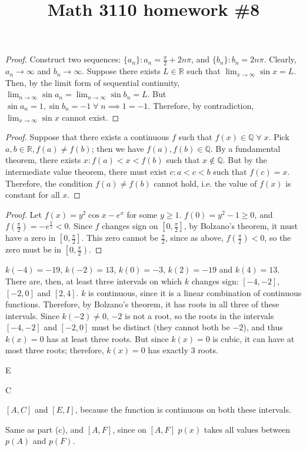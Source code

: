 

\title{Math 3110 homework \#8}
\author{\name}
\maketitle

\begin{proof}
  Construct two sequences: $\{a_n\}: a_n = \frac{\pi}{2} + 2n\pi$, and $\{b_n\}: b_n = 2n\pi$. Clearly, $a_n \rightarrow \infty$ and $b_n \rightarrow \infty$. Suppose there exists $L \in \mathbb{R}$ such that $\lim_{x \rightarrow \infty} \sin x = L$. Then, by the limit form of sequential continuity, $\lim_{n \rightarrow \infty} \sin a_n = \lim_{n \rightarrow \infty} \sin b_n = L$. But $\sin a_n = 1, \sin b_n = -1 \;\forall\; n \implies 1 = -1$. Therefore, by contradiction, $\lim_{x \rightarrow \infty} \sin x$ cannot exist.
\end{proof}

\begin{proof}
  Suppose that there exists a continuous $f$ such that $f(x) \in \mathbb{Q} \;\forall\; x$. Pick $a, b \in \mathbb{R}, f(a) \neq f(b)$; then we have $f(a), f(b) \in \mathbb{Q}$. By a fundamental theorem, there exists $x: f(a) < x < f(b)$ such that $x \notin \mathbb{Q}$. But by the intermediate value theorem, there must exist $c: a < c < b$ such that $f(c) = x$. Therefore, the condition $f(a) \neq f(b)$ cannot hold, i.e. the value of $f(x)$ is constant for all $x$.
\end{proof}

\begin{proof}
  Let $f(x) = y^2 \cos x - e^x$ for some $y \geq 1$. $f(0) = y^2 - 1 \geq 0$, and $f\left(\frac{\pi}{2}\right) = -e^{\frac{\pi}{2}} < 0$. Since $f$ changes sign on $\left[0, \frac{\pi}{2}\right]$, by Bolzano's theorem, it must have a zero in $\left[0, \frac{\pi}{2}\right]$. This zero cannot be $\frac{\pi}{2}$, since as above, $f\left(\frac{\pi}{2}\right) < 0$, so the zero must be in $\left[0, \frac{\pi}{2}\right)$.
\end{proof}


$k(-4) = -19$, $k(-2) = 13$, $k(0) = -3$, $k(2) = -19$ and $k(4) = 13$. There are, then, at least three intervals on which $k$ changes sign: $[-4, -2]$, $[-2, 0]$ and $[2, 4]$. $k$ is continuous, since it is a linear combination of continuous functions. Therefore, by Bolzano's theorem, it has roots in all three of these intervals. Since $k(-2) \neq 0$, $-2$ is not a root, so the roots in the intervals $[-4, -2]$ and $[-2, 0]$ must be distinct (they cannot both be $-2$), and thus $k(x) = 0$ has at least three roots. But since $k(x) = 0$ is cubic, it can have at most three roots; therefore, $k(x) = 0$ has exactly 3 roots.


E

C

$[A, C]$ and $[E, I]$, because the function is continuous on both these intervals.

Same as part (c), and $[A, F]$, since on $[A, F]$ $p(x)$ takes all values between $p(A)$ and $p(F)$.


